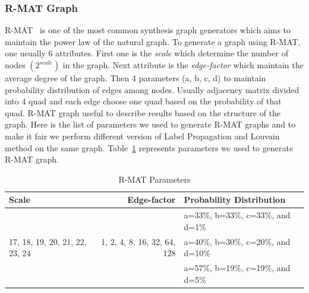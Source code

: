 \documentclass[default,iicol]{sn-jnl}%
\theoremstyle{thmstyleone}%
\theoremstyle{thmstyletwo}%
\theoremstyle{thmstylethree}%
\begin{document}
\subsubsection{R-MAT Graph}
R-MAT~\cite{chakrabarti2004r} is one of the most common synthesis graph generators which aims to maintain 
the power law of the natural graph. To generate a graph using R-MAT, one usually 6 attributes. First one is the 
\textit{scale} which determine the number of nodes $(2^{scale})$ in the graph. Next attribute is the \textit{edge-factor} 
which maintain the average degree of the graph. Then 4 parameters (a, b, c, d) to maintain probability distribution 
of edges among nodes. Usually adjacency matrix divided into 4 quad and each edge choose one quad based on the 
probability of that quad. R-MAT graph useful to describe results based on the structure of the graph. Here is the list 
of parameters we used to generate R-MAT graphs and to make it fair we perform different version of Label Propagation 
and Louvain method on the same graph. Table~\ref{tab:rmat_graph} represents parameters we used to generate 
R-MAT graph. 
\begin{table}[htb]
\caption{R-MAT Parameters}
\label{tab:rmat_graph}
\centering
\begin{tabular}[c]{| l | r | l |}
\hline
Scale & Edge-factor & Probability Distribution\\ \hline
\multirow{3}{|*}{17, 18, 19, 20, 21, 22, 23, 24} & \multirow{3}{*}{1, 2, 4, 8, 16, 32, 64, 128} & a=33\%, b=33\%, c=33\%, and d=1\% \\ \cline{3-3}
 &  & a=40\%, b=30\%, c=20\%, and d=10\% \\ \cline{3-3}
 &  & a=57\%, b=19\%, c=19\%, and d=5\% \\ \hline
\end{tabular}
\end{table}
\end{document}
